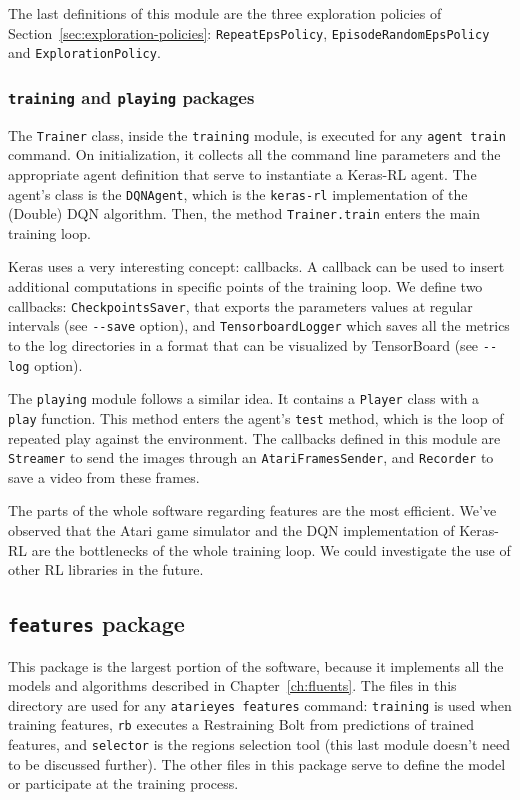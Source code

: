 The last definitions of this module are the three exploration policies of
Section~\ref{sec:exploration-policies}: \texttt{RepeatEpsPolicy},
\texttt{EpisodeRandomEpsPolicy} and \texttt{ExplorationPolicy}.


\subsubsection*{\texttt{training} and \texttt{playing} packages}

The \texttt{Trainer} class, inside the \texttt{training} module, is executed
for any \verb|agent train| command. On initialization, it collects all the
command line parameters and the appropriate agent definition that serve to
instantiate a Keras-RL agent. The agent's class is the \texttt{DQNAgent},
which is the \texttt{keras-rl} implementation of the (Double) DQN algorithm.
Then, the method \verb|Trainer.train| enters the main training loop.

Keras uses a very interesting concept: callbacks. A callback can be used to
insert additional computations in specific points of the training loop.  We
define two callbacks: \texttt{CheckpointsSaver}, that exports the parameters
values at regular intervals (see \verb|--save| option), and
\texttt{TensorboardLogger} which saves all the metrics to the log directories
in a format that can be visualized by TensorBoard (see \verb|--log| option).

The \texttt{playing} module follows a similar idea. It contains a
\texttt{Player} class with a \texttt{play} function. This method enters the
agent's \texttt{test} method, which is the loop of repeated play against the
environment. The callbacks defined in this module are \texttt{Streamer} to
send the images through an \texttt{AtariFramesSender}, and \texttt{Recorder}
to save a video from these frames.

The parts of the whole software regarding features are the most efficient.
We've observed that the Atari game simulator and the DQN implementation of
Keras-RL are the bottlenecks of the whole training loop. We could investigate
the use of other RL libraries in the future.


\subsection{\texttt{features} package}

This package is the largest portion of the software, because it implements all
the models and algorithms described in Chapter~\ref{ch:fluents}. The files in
this directory are used for any \verb|atarieyes features| command:
\texttt{training} is used when training features, \texttt{rb} executes a
Restraining Bolt from predictions of trained features, and \texttt{selector}
is the regions selection tool (this last module doesn't need to be discussed
further).  The other files in this package serve to define the model or
participate at the training process.


